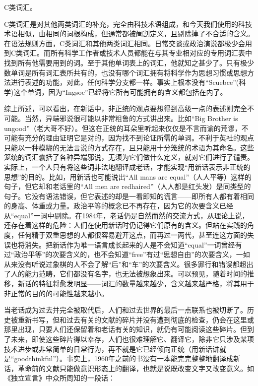 C类词汇。

C类词汇是对其他两类词汇的补充，完全由科技术语组成，和今天我们使用的科技术语相似，由相同的词根构成，但通常都被阉割定义，且剔除掉了不合适的含义。在语法规则方面，C类词汇和其他两类词汇相同。日常交谈或政治演说都极少会用到C类词汇。而所有科学工作者或技术人员都能在与其专业相对应的专用词汇表中找到所有他需要用到的词。至于其他单词表上的词汇，他就知之甚少了。只有极少数单词是所有词汇表所共有的，也没有哪个词汇拥有将科学作为思想习惯或思想方法进行表述的功能，对此，任何科学分支都一样。事实上根本没有``Scuebce''(科学)这个单词，因为``Ingsoc''已经将它所有可能拥有的含义都包括在内了。

综上所述，可以看出，在新话中，非正统的观点要想得到高级一点的表述则完全不可能。当然，异端邪说很可能以非常粗鲁的方式讲出来。比如``Big
Brother is
ungood''（老大哥不好）。但这在正统的耳朵里听起来仅仅是不言而谕的荒谬，不可能有充分的理由证明它是对的，因为找不到论证所需的单词。不利于英社的观点只能以一种模糊的无法言说的方式存在，且只能用十分笼统的术语为其命名。这些笼统的词汇囊括了各种异端邪说，无须为它们做什么定义，就对它们进行了谴责。实际上，一个人只有将这些词非法地翻译成老话，才能实现``用新话表示非正统的思想''的目的。比如，用新话也可能说出``All
mans are equal''（人人平等）这样的句子，但它却和老话里的``All men are
redhaired''（人人都是红头发）是同类型的句子。它没有语法错误，但它表述的却是一看即知的谎言------即所有人都有着相同的身高、体重或力量。政治平等的概念已不再存在，因为它的次要含义已经从``equal''一词中剔除。在1984年，老话仍是自然而然的交流方式，从理论上说，还存在着这样的危险：人们在使用新话时仍记得它们原有的含义。但站在实践的角度，任何精于双重思想的人都很容易避开这点，而再过一两代，甚至连这方面的失误也将消失。把新话作为唯一语言成长起来的人是不会知道``equal''一词曾经有过``政治平等''的次要含义的，也不会知道``free''有过``思想自由''的次要含义，一如从来没有听说过象棋的人不会了解``后''和``车''的次要含义。很多罪行和错误都超出了人的能力范畴，它们都没有名字，也无法被想象出来。可以预见，随着时间的推移，新话的特征将愈发明显------词汇的数量越来越少，含义越来越严格，将其用于非正常的目的的可能性越来越小。

当老话成为过去并完全被取代后，人们和过去世界的最后一点联系也被切断了。历史被重新书写，但和过去有关的文献的碎片并没有遭到彻底的检查，仍会在这里或那里出现，只要人们还保留着和老话有关的知识，就仍有可能阅读这些碎片。但到了未来，即使这些碎片得以幸存，人们也很难理解它、翻译它，除非它只涉及某项技术进步或非常简单的日常行为，再不就是它已经倾向正统（用新话讲就是``goodthinkful''）。事实上，1960年之前的书没有一本能完完整整地翻译成新话，革命前的文献只能做意识形态上的翻译，也就是说既改变文字又改变意义。如《独立宣言》中众所周知的一段话：

